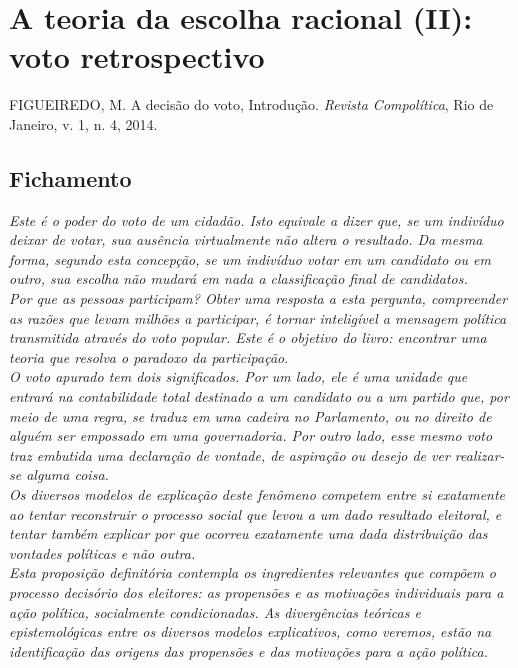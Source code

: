 \section{A teoria da escolha racional (II): voto retrospectivo}

FIGUEIREDO, M. A decisão do voto, Introdução. \textit{Revista Compolítica}, Rio de Janeiro, v. 1,
n. 4, 2014.

\subsection{Fichamento}

\noindent \textit{Este é o poder do voto de um cidadão. Isto equivale a dizer que, se um indivíduo deixar de votar, sua ausência virtualmente não altera o resultado. Da mesma forma, segundo esta concepção, se um indivíduo votar em um candidato ou em outro, sua escolha não mudará em nada a classificação final de candidatos.} \cite[~p. 209]{marcus_figueiredo} \\

\noindent \textit{Por que as pessoas participam? Obter uma resposta a esta pergunta, compreender as razões que levam milhões a participar, é tornar inteligível a mensagem política transmitida através do voto popular. Este é o objetivo do livro: encontrar uma teoria que resolva o paradoxo da participação}. \cite[~p. 210]{marcus_figueiredo} \\

\noindent \textit{O voto apurado tem dois significados. Por um lado, ele é uma unidade que entrará na contabilidade total destinado a um candidato ou a um partido que, por meio de uma regra, se traduz em uma cadeira no Parlamento, ou no direito de alguém ser empossado em uma governadoria. Por outro lado, esse mesmo voto traz embutida uma declaração de vontade, de aspiração ou desejo de ver realizar-se alguma coisa.} \cite[~p. 211]{marcus_figueiredo} \\

\noindent \textit{Os diversos modelos de explicação deste fenômeno competem entre si exatamente ao tentar reconstruir o processo social que levou a um dado resultado eleitoral, e tentar também explicar por que ocorreu exatamente uma dada distribuição das vontades políticas e não outra.} \cite[~p. 211]{marcus_figueiredo} \\

\noindent \textit{Esta proposição definitória contempla os ingredientes relevantes que compõem o processo decisório dos eleitores: as propensões e as motivações individuais para a ação política, socialmente condicionadas. As divergências teóricas e epistemológicas entre os diversos modelos explicativos, como veremos, estão na identificação das origens das propensões e das motivações para a ação política.} \cite[~p. 213]{marcus_figueiredo} \\

